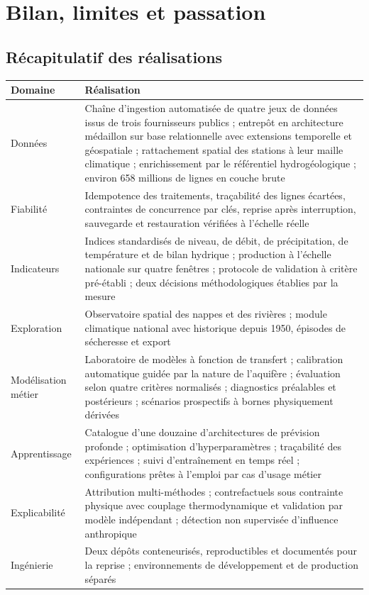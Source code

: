 \chapter{Bilan, limites et passation}
\label{ch:bilan}


\section{Récapitulatif des réalisations}

\begin{center}
\begin{tabularx}{\textwidth}{@{}p{3.4cm}X@{}}
\toprule
\textbf{Domaine} & \textbf{Réalisation} \\
\midrule
Données & Chaîne d'ingestion automatisée de quatre jeux de données issus de trois fournisseurs
publics ; entrepôt en architecture médaillon sur base relationnelle avec extensions temporelle
et géospatiale ; rattachement spatial des stations à leur maille climatique ; enrichissement par
le référentiel hydrogéologique ; environ \num{658} millions de lignes en couche brute \\
Fiabilité & Idempotence des traitements, traçabilité des lignes écartées, contraintes de
concurrence par clés, reprise après interruption, sauvegarde et restauration vérifiées à
l'échelle réelle \\
Indicateurs & Indices standardisés de niveau, de débit, de précipitation, de température et de
bilan hydrique ; production à l'échelle nationale sur quatre fenêtres ; protocole de validation
à critère pré-établi ; deux décisions méthodologiques établies par la mesure \\
Exploration & Observatoire spatial des nappes et des rivières ; module climatique national avec
historique depuis 1950, épisodes de sécheresse et export \\
Modélisation métier & Laboratoire de modèles à fonction de transfert ; calibration automatique
guidée par la nature de l'aquifère ; évaluation selon quatre critères normalisés ; diagnostics
préalables et postérieurs ; scénarios prospectifs à bornes physiquement dérivées \\
Apprentissage & Catalogue d'une douzaine d'architectures de prévision profonde ; optimisation
d'hyperparamètres ; traçabilité des expériences ; suivi d'entraînement en temps réel ;
configurations prêtes à l'emploi par cas d'usage métier \\
Explicabilité & Attribution multi-méthodes ; contrefactuels sous contrainte physique avec
couplage thermodynamique et validation par modèle indépendant ; détection non supervisée
d'influence anthropique \\
Ingénierie & Deux dépôts conteneurisés, reproductibles et documentés pour la reprise ;
environnements de développement et de production séparés \\
\bottomrule
\end{tabularx}
\end{center}


